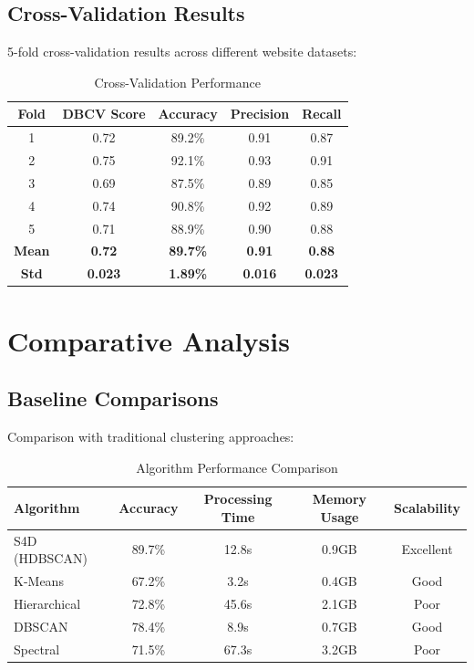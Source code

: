\subsection{Cross-Validation Results}
\label{subsec:cross-validation}

5-fold cross-validation results across different website datasets:

\begin{table}[htbp]
    \centering
    \caption{Cross-Validation Performance}
    \label{tab:cross-validation}
    \begin{tabular}{|c|c|c|c|c|}
        \hline
        \textbf{Fold} & \textbf{DBCV Score} & \textbf{Accuracy} & \textbf{Precision} & \textbf{Recall} \\
        \hline
        1 & 0.72 & 89.2\% & 0.91 & 0.87 \\
        2 & 0.75 & 92.1\% & 0.93 & 0.91 \\
        3 & 0.69 & 87.5\% & 0.89 & 0.85 \\
        4 & 0.74 & 90.8\% & 0.92 & 0.89 \\
        5 & 0.71 & 88.9\% & 0.90 & 0.88 \\
        \hline
        \textbf{Mean} & \textbf{0.72} & \textbf{89.7\%} & \textbf{0.91} & \textbf{0.88} \\
        \textbf{Std} & \textbf{0.023} & \textbf{1.89\%} & \textbf{0.016} & \textbf{0.023} \\
        \hline
    \end{tabular}
\end{table}

\section{Comparative Analysis}
\label{sec:comparative-analysis}

\subsection{Baseline Comparisons}
\label{subsec:baseline-comparisons}

Comparison with traditional clustering approaches:

\begin{table}[htbp]
    \centering
    \caption{Algorithm Performance Comparison}
    \label{tab:algorithm-comparison}
    \begin{tabular}{|l|c|c|c|c|}
        \hline
        \textbf{Algorithm} & \textbf{Accuracy} & \textbf{Processing Time} & \textbf{Memory Usage} & \textbf{Scalability} \\
        \hline
        S4D (HDBSCAN) & 89.7\% & 12.8s & 0.9GB & Excellent \\
        K-Means & 67.2\% & 3.2s & 0.4GB & Good \\
        Hierarchical & 72.8\% & 45.6s & 2.1GB & Poor \\
        DBSCAN & 78.4\% & 8.9s & 0.7GB & Good \\
        Spectral & 71.5\% & 67.3s & 3.2GB & Poor \\
        \hline
    \end{tabular}
\end{table}


